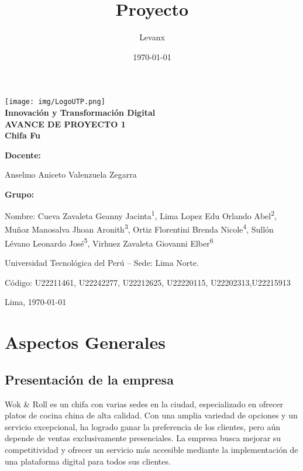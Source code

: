 \documentclass{article}
\title{Proyecto}
\author{Levanx}
\date{\today}
\begin{document}
\begin{doublespace}
\begin{center}
    \vspace*{1cm}

    \centering
    \texttt{[image: img/LogoUTP.png]}\\[1cm]
    
    \large{\textbf{Innovación y Transformación Digital}} 
    \\[0.5cm] 
    
    \large{\bf AVANCE DE PROYECTO 1}
    \\[0.5cm] 
    \LARGE \textbf{{Chifa Fu}}
\end{center}
\vspace{2cm}
\large{\bf Docente: }
\begin{center}
    \large{Anselmo Aniceto Valenzuela Zegarra}
\end{center}
\large{\bf Grupo: }
\begin{center}
    \large{Nombre: Cueva Zavaleta Geanny Jacinta\textsuperscript{1}, Lima Lopez Edu Orlando Abel\textsuperscript{2}, Muñoz Manosalva Jhoan Aronith\textsuperscript{3}, Ortiz Florentini Brenda Nicole\textsuperscript{4}, Sullón Lévano Leonardo José\textsuperscript{5}, Virhuez Zavaleta Giovanni Elber\textsuperscript{6}}
\end{center}
\begin{center}
    \large{ Universidad Tecnológica del Perú – Sede: Lima Norte.}
\end{center}
    
\begin{center}
    \large{Código: U22211461, U22242277, U22212625, U22220115, U22202313,U22215913}
\end{center}
\begin{center}
Lima, \today
\end{center}
\newpage
\vspace*{0.1cm}
\tableofcontents
\newpage
\vspace*{0.2cm}
\section{Aspectos Generales}
    \subsection{Presentación de la empresa}
    \noindent Wok \& Roll es un chifa con varias sedes en la ciudad, especializado en ofrecer
platos de cocina china de alta calidad. Con una amplia variedad de opciones y un servicio excepcional, ha logrado ganar la preferencia de los clientes, pero aún depende de ventas exclusivamente presenciales. La empresa busca mejorar su competitividad y ofrecer un servicio más accesible mediante la implementación de una plataforma digital para todos sus clientes.


\end{doublespace}
\end{document}

